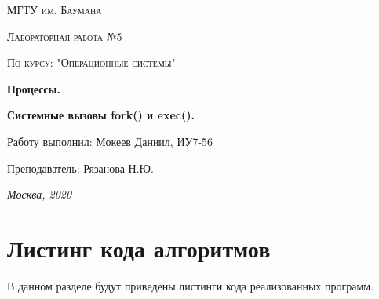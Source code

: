 \documentclass[12pt]{report}
\begin{document}
\begin{titlepage}
	\centering
	{\scshape\LARGE МГТУ им. Баумана \par}
	\vspace{3cm}
	{\scshape\Large Лабораторная работа №5\par}
	\vspace{0.5cm}	
	{\scshape\Large По курсу: "Операционные системы"\par}
	\vspace{1.5cm}
	\centering
	{\huge\bfseries Процессы. \par}
	\centering
	 {\huge\bfseries Системные вызовы fork() и exec().\par}
	\vspace{2cm}
	\Large Работу выполнил: Мокеев Даниил, ИУ7-56\par
	\vspace{0.5cm}
	\Large Преподаватель:  Рязанова Н.Ю.\par

	\vfill
	\large \textit {Москва, 2020} \par
\end{titlepage}


\newpage

\section{Листинг кода алгоритмов}
В данном разделе будут приведены листинги кода реализованных программ. 
\end{document}
